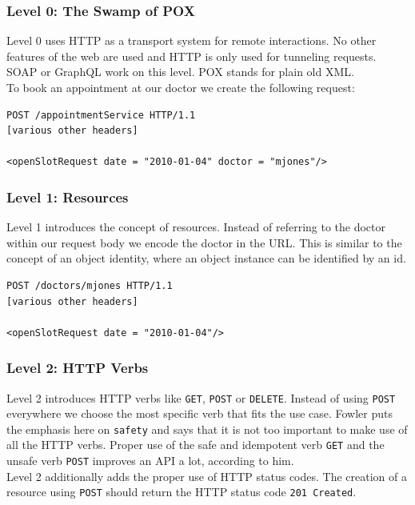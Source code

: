 \subsubsection{Level 0: The Swamp of POX}
Level 0 uses HTTP as a transport system for remote interactions. No other features of the web are used and HTTP is only used for tunneling requests. SOAP or GraphQL work on this level. POX stands for plain old XML. \\
To book an appointment at our doctor we create the following request:

\lstset{language=XML}
\begin{lstlisting}[caption=Level 0: \gls{remoteprocedurecall} on HTTP]
POST /appointmentService HTTP/1.1
[various other headers]

<openSlotRequest date = "2010-01-04" doctor = "mjones"/>
\end{lstlisting}

\subsubsection{Level 1: Resources}
Level 1 introduces the concept of resources. Instead of referring to the doctor within our request body we encode the doctor in the URL. This is similar to the concept of an object identity, where an object instance can be identified by an id.

\lstset{language=XML}
\begin{lstlisting}[caption=Level 1: Referring to the doctor as a resource.]
POST /doctors/mjones HTTP/1.1
[various other headers]

<openSlotRequest date = "2010-01-04"/>
\end{lstlisting}

\subsubsection{Level 2: HTTP Verbs}
Level 2 introduces HTTP verbs like \lstinline{GET}, \lstinline{POST} or \lstinline{DELETE}. Instead of using \lstinline{POST} everywhere we choose the most specific verb that fits the use case.
Fowler puts the emphasis here on \lstinline{safety} and says that it is not too important to make use of all the HTTP verbs. Proper use of the safe and idempotent verb \lstinline{GET} and the unsafe verb \lstinline{POST} improves an API a lot, according to him. \\
Level 2 additionally adds the proper use of HTTP status codes. The creation of a resource using \lstinline{POST} should return the HTTP status code \lstinline{201 Created}.

